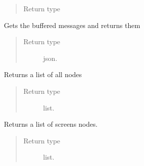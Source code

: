 \documentclass[letterpaper,10pt,english]{sphinxmanual}
\begin{document}
\begin{fulllineitems}
\begin{fulllineitems}
\begin{quote}
\begin{description}
\item[{Return type}] \leavevmode
{\hyperref[api:swnp.Node]{}}

\end{description}\end{quote}

\end{fulllineitems}


\begin{fulllineitems}
\label{api:swnp.SWNP.get_buffer}
Gets the buffered messages and returns them
\begin{quote}\begin{description}
\item[{Return type}] \leavevmode
json.

\end{description}\end{quote}

\end{fulllineitems}


\begin{fulllineitems}
\label{api:swnp.SWNP.get_list}
Returns a list of all nodes
\begin{quote}\begin{description}
\item[{Return type}] \leavevmode
list.

\end{description}\end{quote}

\end{fulllineitems}


\begin{fulllineitems}
\label{api:swnp.SWNP.get_screen_list}
Returns a list of screens nodes.
\begin{quote}\begin{description}
\item[{Return type}] \leavevmode
list.

\end{description}\end{quote}

\end{fulllineitems}


\end{fulllineitems}
\end{document}
